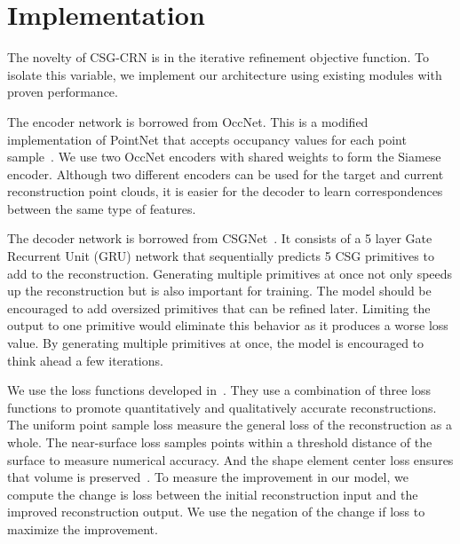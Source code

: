 
\chapter{Implementation}
\label{chap:implementation}

The novelty of CSG-CRN is in the iterative refinement objective function. To isolate this variable, we implement our architecture using existing modules with proven performance.

The encoder network is borrowed from OccNet. This is a modified implementation of PointNet that accepts occupancy values for each point sample~\cite{Mescheder2019}. We use two OccNet encoders with shared weights to form the Siamese encoder. Although two different encoders can be used for the target and current reconstruction point clouds, it is easier for the decoder to learn correspondences between the same type of features.

The decoder network is borrowed from CSGNet~\cite{Sharma2018}. It consists of a 5 layer Gate Recurrent Unit (GRU) network that sequentially predicts 5 CSG primitives to add to the reconstruction. Generating multiple primitives at once not only speeds up the reconstruction but is also important for training. The model should be encouraged to add oversized primitives that can be refined later. Limiting the output to one primitive would eliminate this behavior as it produces a worse loss value. By generating multiple primitives at once, the model is encouraged to think ahead a few iterations.

We use the loss functions developed in~\cite{Genova2019, Genova2020}. They use a combination of three loss functions to promote quantitatively and qualitatively accurate reconstructions. The uniform point sample loss measure the general loss of the reconstruction as a whole. The near-surface loss samples points within a threshold distance of the surface to measure numerical accuracy. And the shape element center loss ensures that volume is preserved~\cite{Genova2019}. To measure the improvement in our model, we compute the change is loss between the initial reconstruction input and the improved reconstruction output. We use the negation of the change if loss to maximize the improvement.